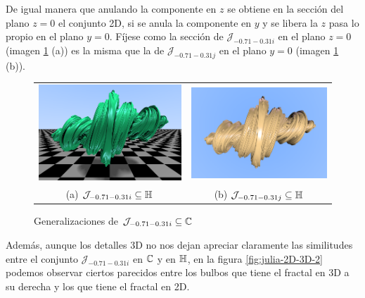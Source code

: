 De igual manera que anulando la componente en $z$ se obtiene en la sección del plano $z=0$ el conjunto 2D, si se anula la componente en $y$ y se libera la $z$ pasa lo propio en el plano $y=0$. Fíjese como la sección de $\mathcal{J}_{-0.71-0.31i}$ en el plano $z=0$ (imagen \ref{fig:julia-3D-varias} (a)) es la misma que la de $\mathcal{J}_{-0.71-0.31j}$ en el plano $y=0$ (imagen \ref{fig:julia-3D-varias} (b)).

\begin{figure}[ht]
    \centering
    \begin{tabular}{cc}
        \includegraphics[scale=0.4]{img/C8/julia-3D-frontal-2.png} &
      \includegraphics[scale=0.44]{img/C8/julia-3D-abajo-2.png} \\    
    (a) $\mathcal{J}_{-0.71-0.31i}\subseteq\mathbb{H}$ & (b) $\mathcal{J}_{-0.71-0.31j}\subseteq\mathbb{H}$  \\
    \end{tabular}
    \caption{Generalizaciones de $\mathcal{J}_{-0.71-0.31i}\subseteq\mathbb{C}$}
    \label{fig:julia-3D-varias}
\end{figure}

Además, aunque los detalles 3D no nos dejan apreciar claramente las similitudes entre el conjunto $\mathcal{J}_{-0.71-0.31i}$ en $\mathbb{C}$ y en $\mathbb{H}$, en la figura \ref{fig:julia-2D-3D-2} podemos observar ciertos parecidos entre los bulbos que tiene el fractal en 3D a su derecha y los que tiene el fractal en 2D.

